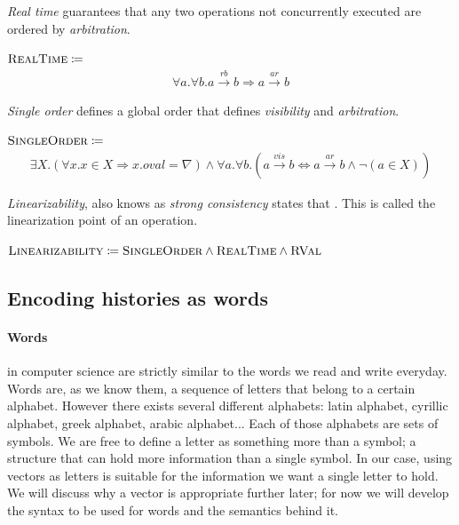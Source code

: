 \documentclass[12pt]{article}
\begin{document}
\textsl{Real time} guarantees that any two operations not concurrently executed are ordered by \textsl{arbitration}.

$\textsc{RealTime} \coloneqq$
\begin{gather*}
\forall a.\forall b. a\xrightarrow{rb}b \Rightarrow a\xrightarrow{ar}b 
\end{gather*}

\textsl{Single order} defines a global order that defines \textsl{visibility} and \textsl{arbitration}.

$\textsc{SingleOrder}\coloneqq$
\begin{gather*}
\exists X.( \forall x.x\in X\Rightarrow x.oval=\nabla )\land\forall a.\forall b.(a\xrightarrow{vis}b \Leftrightarrow a\xrightarrow{ar}b\land\neg(a\in X))
\end{gather*}

\textsl{Linearizability}, also knows as \textsl{strong consistency} states that \cite{ViottiVukolic}. This  is called the linearization point of an operation.

\begin{center}
$\textsc{Linearizability} \coloneqq \textsc{SingleOrder}\land\textsc{RealTime}\land\textsc{RVal}$
\end{center}

\subsection{Encoding histories as words}


\paragraph{Words} in computer science are strictly similar to the words we read and write everyday. Words are, as we know them, a sequence of letters that belong to a certain alphabet. However there exists several different alphabets: latin alphabet, cyrillic alphabet, greek alphabet, arabic alphabet... Each of those alphabets are sets of symbols. We are free to define a letter as something more than a symbol; a structure that can hold more information than a single symbol. In our case, using vectors as letters is suitable for the information we want a single letter to hold. We will discuss why a vector is appropriate further later; for now we will develop the syntax to be used for words and the semantics behind it.
\end{document}
